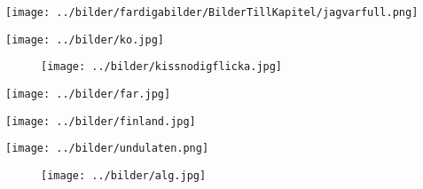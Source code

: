 \begin{intersong}
\sffamily\bfseries\LARGE{}
\begin{center}
\texttt{[image: ../bilder/fardigabilder/BilderTillKapitel/jagvarfull.png]} 
\end{center}
\end{intersong}
\sclearpage

\begin{intersong}
\begin{center}
\texttt{[image: ../bilder/ko.jpg]} 
\end{center}
\end{intersong}
\sclearpage


\sclearpage

%
\clearpage

\begin{figure}
\begin{center}
\texttt{[image: ../bilder/kissnodigflicka.jpg]} 
\end{center}
\end{figure}
\clearpage

\begin{intersong}
\begin{center}
\texttt{[image: ../bilder/far.jpg]} 
\end{center}
\end{intersong}
\sclearpage


\clearpage

\sclearpage

\begin{intersong}
\begin{center}
\texttt{[image: ../bilder/finland.jpg]} 
\end{center}
\end{intersong}
\sclearpage

\sclearpage

\sclearpage

\begin{intersong}
\begin{center}
\texttt{[image: ../bilder/undulaten.png]} 
\end{center}
\end{intersong}
\sclearpage

\sclearpage

\sclearpage



\begin{figure}
\begin{center}
\texttt{[image: ../bilder/alg.jpg]} 
\end{center}
\end{figure}
\clearpage

\clearpage

\clearpage

\clearpage

\clearpage

\clearpage


%
\clearpage

